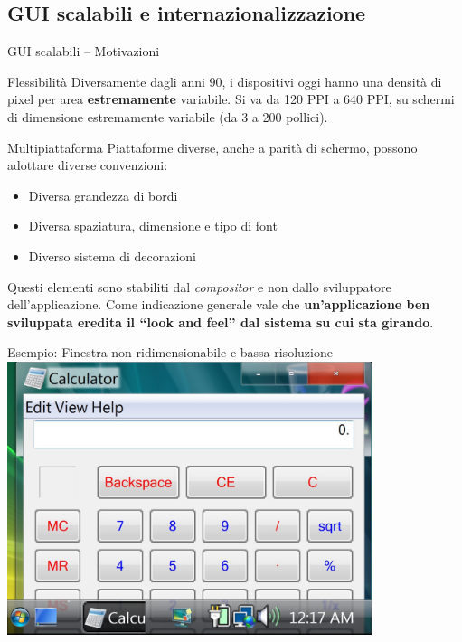\documentclass[presentation]{beamer}
\begin{document}
\subsection{GUI scalabili e internazionalizzazione}

\begin{frame}{GUI scalabili -- Motivazioni}
\begin{block}{Flessibilità}
Diversamente dagli anni 90, i dispositivi oggi hanno una densità di pixel per area \textbf{estremamente} variabile. Si va da 120 PPI a 640 PPI, su schermi di dimensione estremamente variabile (da 3 a 200 pollici).
\end{block}

\begin{block}{Multipiattaforma}
Piattaforme diverse, anche a parità di schermo, possono adottare diverse convenzioni:
\begin{itemize}
\item Diversa grandezza di bordi
\item Diversa spaziatura, dimensione e tipo di font
\item Diverso sistema di decorazioni
\end{itemize}

Questi elementi sono stabiliti dal \emph{compositor} e non dallo sviluppatore dell'applicazione. Come indicazione generale vale che \textbf{un'applicazione ben sviluppata eredita il ``look and feel'' dal sistema su cui sta girando}.
\end{block}
\end{frame}

\begin{frame}{Esempio: Finestra non ridimensionabile e bassa risoluzione}
\centering
\includegraphics[width=0.8\textwidth]{img/lowres}
\end{frame}
\end{document}
